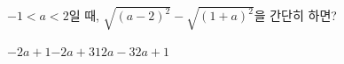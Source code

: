 $-1<a<2$일 때, $\sqrt{(a-2)^2}-\sqrt{(1+a)^2}$을 간단히 하면?
\begin{choices32}{$-2a+1$}{$-2a+3$}{$1$}{$2a-3$}{$2a+1$}\end{choices32}

